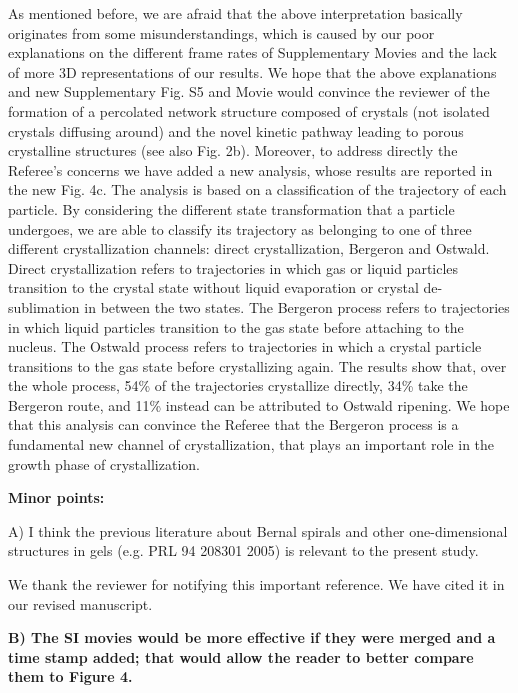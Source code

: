 \documentclass[11pt,a4paper]{article}
\newenvironment{referee}%
{\bigskip\singlespacing\bf}%
{\par\bigskip}
\begin{document}
As mentioned before, we are afraid that the above interpretation basically originates from some misunderstandings, which is caused by our poor explanations on the different frame rates of Supplementary Movies and the lack of more 3D representations of our results. We hope that the above explanations and new Supplementary Fig. S5 and Movie would convince the reviewer of the formation of a percolated network structure composed of crystals (not isolated crystals diffusing around) and the novel kinetic pathway leading to porous crystalline structures (see also Fig. 2b).
Moreover, to address directly the Referee's concerns we have added a new analysis, whose results are reported in the new Fig. 4c.
The analysis is based on a classification of the trajectory of 
each particle. By considering the different state transformation that a particle undergoes, we are able to classify its trajectory as belonging to one of three different crystallization channels: direct crystallization, Bergeron and Ostwald. Direct crystallization refers to trajectories in
which gas or liquid particles transition to the crystal state without liquid evaporation or crystal de-sublimation in between the two states.
The Bergeron process refers to trajectories in which liquid particles transition to the gas state before attaching to the nucleus. The Ostwald
process refers to trajectories in which a crystal particle transitions to the gas state before crystallizing again.
The results show that, over the whole process, 54\% of the trajectories crystallize directly, 34\% take the Bergeron route, and
11\% instead can be attributed to Ostwald ripening. We hope that this analysis can convince the Referee that the Bergeron process is a
fundamental new channel of crystallization, that plays an important role in the growth phase of crystallization.


\begin{referee}
Minor points:

A) I think the previous literature about Bernal spirals and other one-dimensional structures in gels (e.g. PRL 94 208301 2005) is relevant to the present study.
\end{referee}

We thank the reviewer for notifying this important reference. We have cited it in our revised manuscript. 


\begin{referee}
B) The SI movies would be more effective if they were merged and a time stamp added; that would allow the reader to better compare them to Figure 4.
\end{referee}
\end{document}
